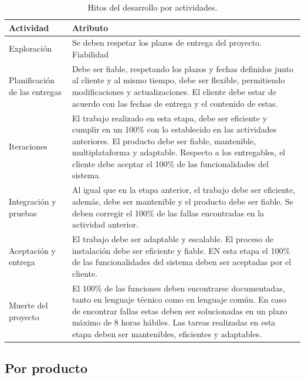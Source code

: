 \begin{table}[H]
    \caption[Hitos del desarrollo por actividades.] {Hitos del desarrollo por actividades.}
    \label{tbl:Objetivos Cuantificales y atributos de calidad por actividades}
    \begin{tabular}{|p{}|p{}|}
        \hline
        \textbf{Actividad} &  \textbf{Atributo}\\
    	\hline
    	\hline
    	Exploración & Se deben respetar los plazos de entrega del proyecto. Fiabilidad \\ \hline
    	Planificación de las entregas & Debe ser fiable, respetando los plazos y fechas definidos junto al cliente y al mismo tiempo, debe ser flexible, permitiendo modificaciones y actualizaciones.
		El cliente debe estar de acuerdo con las fechas de entrega y el contenido de estas. \\ \hline
    	Iteraciones & El trabajo realizado en esta etapa, debe ser eficiente y cumplir en un 100\% con lo establecido en las actividades anteriores. El producto debe ser fiable, mantenible, multiplataforma y adaptable. Respecto a los entregables, el cliente debe aceptar el 100\% de las funcionalidades del sistema. \\ \hline
    	Integración y pruebas & Al igual que en la etapa anterior, el trabajo debe ser eficiente, además, debe ser mantenible y el producto debe ser fiable. Se deben corregir el 100\% de las fallas encontradas en la actividad anterior. \\ \hline
    	Aceptación y entrega & El trabajo debe ser adaptable y escalable. El proceso de instalación debe ser eficiente y fiable. EN esta etapa el 100\% de las funcionalidades del sistema deben ser aceptadas por el cliente. \\ \hline
    	Muerte del proyecto & El 100\% de las funciones deben encontrarse documentadas, tanto en lenguaje técnico como en lenguaje común. En caso de encontrar fallas estas deben ser solucionadas en un plazo máximo de 8 horas hábiles. Las tareas realizadas en esta etapa deben ser mantenibles, eficientes y adaptables.  \\ 
        \hline
    \end{tabular}
\end{table}

\subsection{Por producto}


